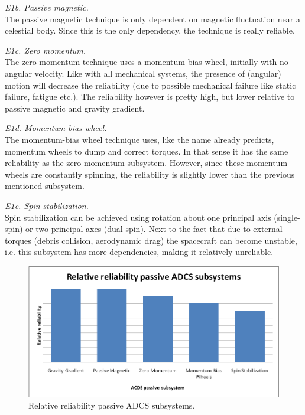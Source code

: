 \begin{enumerate}[A]
\textit{E1b. Passive magnetic.}\\
The passive magnetic technique is only dependent on magnetic fluctuation near a celestial body. Since this is the only dependency, the technique is really reliable.

\textit{E1c. Zero momentum.}\\
The zero-momentum technique uses a momentum-bias wheel, initially with no angular velocity. Like with all mechanical systems, the presence of (angular) motion will decrease the reliability (due to possible mechanical failure like static failure, fatigue etc.). The reliability however is pretty high, but lower relative to passive magnetic and gravity gradient.

\textit{E1d. Momentum-bias wheel.}\\ 
The momentum-bias wheel technique uses, like the name already predicts, momentum wheels to dump and correct torques. In that sense it has the same reliability as the zero-momentum subsystem. However, since these momentum wheels are constantly spinning, the reliability is slightly lower than the previous mentioned subsystem.

\textit{E1e. Spin stabilization.}\\
Spin stabilization can be achieved using rotation about one principal axis (single-spin) or two principal axes (dual-spin).  Next to the fact that due to external torques (debris collision, aerodynamic drag) the spacecraft can become unstable, i.e. this subsystem has more dependencies, making it relatively unreliable.

\begin{figure} [h]
	\begin{center}
 \includegraphics[width=1.0\textwidth,angle=0]{chapters/img/TRA_ADCS_P.png}	
	\caption{Relative reliability passive ADCS subsystems.}
	\label{TRA_ADCS_P}
	\end{center}
\end{figure}


\end{enumerate}

